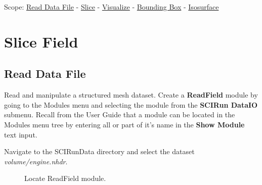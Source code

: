 \documentclass[fleqn,11pt,openany]{book}
\begin{document}
\begin{introduction}
Scope: \hyperref[readdata]{Read Data File} - \hyperref[slice]{Slice} -
\hyperref[visualize]{Visualize} - \hyperref[bbox]{Bounding Box} - \hyperref[isosurface]{Isosurface}
\end{introduction}

\section{Slice Field}

\subsection{Read Data File}\label{readdata}

Read and manipulate a structured mesh dataset.
Create a \textbf{ReadField} module by going to the Modules menu and selecting
the module from the \textbf{SCIRun DataIO} submenu.
Recall from the User Guide that a module can be located in the Modules
menu tree by entering all or part of it's name in the
\textbf{Show Module} text input.

Navigate to the SCIRunData directory and select the dataset \emph{volume/engine.nhdr}.

\begin{figure}[H]
\caption{Locate ReadField module.}
\label{fig:readfield}
\end{figure}
\end{document}
